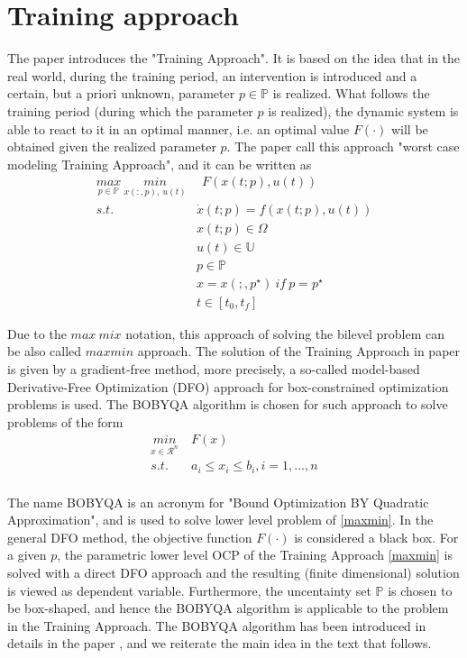 \documentclass  [
  paper    = a4,
  BCOR     = 10mm,
  twoside,
  fontsize = 12pt,
  fleqn,
  toc      = bibnumbered,
  toc      = listofnumbered,
  numbers  = noendperiod,
  headings = normal,
  listof   = leveldown,
  version  = 3.03
]                                       {scrreprt}
\newcommand{\<}{\langle}
\renewcommand{\>}{\rangle}
\begin{document}
\section{Training approach}
The paper \cite{MatSch22} introduces the "Training Approach".  It is based on the idea that in the real world, during the training period, an intervention is introduced and a certain, but a priori unknown, parameter $p  \in   \mathbb{P}$ is realized. What follows the training period (during which the parameter $p$ is realized), the dynamic system is able to react to it in an optimal manner, i.e. an optimal value $ F(\cdot)$ will be obtained given the  realized parameter $p$. The paper \cite{MatSch22} call this approach "worst case modeling Training Approach", and it can be written as 
\begin{equation}
	\begin{aligned}
		\underset{p  \in   \mathbb{P}}{max} \ \underset{x(:,p), \  u(t)}{min} &  \ \ F(x(t;p), u(t))\\ 
	s.t.\ \  &  \dot{x} (t;p) = f(x(t;p), u(t))\\ 
& x(t;p) \in \Omega \\
& u(t) \in \mathbb{U}  \\
& p  \in   \mathbb{P}  \\
& x = x(;,p^\star) \ if \ p = p^\star \\
& t \in [t_0, t_f]
	\end{aligned}
	\label{maxmin}
\end{equation}

Due to the $max \ mix$ notation, this approach of solving the bilevel problem can be also called $max min$ approach. The solution of the Training Approach in paper \cite{MatSch22} is given by a gradient-free method, more precisely, a so-called model-based Derivative-Free Optimization (DFO) approach for box-constrained optimization problems is used. The BOBYQA algorithm is chosen for such approach to solve problems of the form
\begin{equation}
	\begin{aligned}
		\underset{x \in \mathcal{R}^n}{min} & \  F(x)  \\ 
		s.t.  & \ a_i \leq x_i \leq b_i, i = 1, ..., n \\
	\end{aligned}
	\label{DFO_bc}
\end{equation}

The name BOBYQA is an acronym for "Bound Optimization BY Quadratic Approximation", and is used to solve lower level problem of \ref{maxmin}. In the general DFO method, the objective function $F(\cdot)$ is considered a black box. For a given $p$, the parametric lower level OCP of the Training Approach \ref{maxmin} is solved with a direct DFO approach and the resulting (finite dimensional) solution is viewed as dependent variable. Furthermore, the uncentainty set $\mathbb{P}$ is chosen to be box-shaped, and hence the BOBYQA algorithm is applicable to the problem in the Training Approach. The BOBYQA algorithm has been introduced in details in the paper \cite{MicPow09}, and we reiterate the main idea in the text that follows.  
\end{document}
